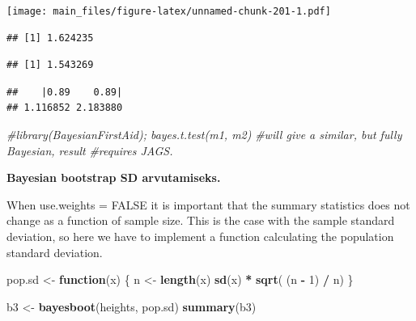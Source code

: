\documentclass[]{book}
\newenvironment{Shaded}{\begin{snugshade}}{\end{snugshade}}
\newcommand{\KeywordTok}[1]{\textcolor[rgb]{0.13,0.29,0.53}{\textbf{#1}}}
\newcommand{\DecValTok}[1]{\textcolor[rgb]{0.00,0.00,0.81}{#1}}
\newcommand{\StringTok}[1]{\textcolor[rgb]{0.31,0.60,0.02}{#1}}
\newcommand{\CommentTok}[1]{\textcolor[rgb]{0.56,0.35,0.01}{\textit{#1}}}
\newcommand{\ControlFlowTok}[1]{\textcolor[rgb]{0.13,0.29,0.53}{\textbf{#1}}}
\newcommand{\OperatorTok}[1]{\textcolor[rgb]{0.81,0.36,0.00}{\textbf{#1}}}
\newcommand{\NormalTok}[1]{#1}
\begin{document}
\texttt{[image: main\_files/figure-latex/unnamed-chunk-201-1.pdf]}

\begin{Shaded}
\end{Shaded}

\begin{verbatim}
## [1] 1.624235
\end{verbatim}

\begin{Shaded}
\end{Shaded}

\begin{verbatim}
## [1] 1.543269
\end{verbatim}

\begin{Shaded}
\end{Shaded}

\begin{verbatim}
##    |0.89    0.89| 
## 1.116852 2.183880
\end{verbatim}

\begin{Shaded}
\begin{Highlighting}[]
\CommentTok{#library(BayesianFirstAid); bayes.t.test(m1, m2) }
\CommentTok{#will give a similar, but fully Bayesian, result}
\CommentTok{#requires JAGS.}
\end{Highlighting}
\end{Shaded}

\textbf{Bayesian bootstrap SD arvutamiseks.}

When use.weights = FALSE it is important that the summary statistics
does not change as a function of sample size. This is the case with the
sample standard deviation, so here we have to implement a function
calculating the population standard deviation.

\begin{Shaded}
\begin{Highlighting}[]
\NormalTok{pop.sd <-}\StringTok{ }\ControlFlowTok{function}\NormalTok{(x) \{}
\NormalTok{  n <-}\StringTok{ }\KeywordTok{length}\NormalTok{(x)}
  \KeywordTok{sd}\NormalTok{(x) }\OperatorTok{*}\StringTok{ }\KeywordTok{sqrt}\NormalTok{( (n }\OperatorTok{-}\StringTok{ }\DecValTok{1}\NormalTok{) }\OperatorTok{/}\StringTok{ }\NormalTok{n)}
\NormalTok{\}}

\NormalTok{b3 <-}\StringTok{ }\KeywordTok{bayesboot}\NormalTok{(heights, pop.sd)}
\KeywordTok{summary}\NormalTok{(b3)}
\end{Highlighting}
\end{Shaded}
\end{document}

